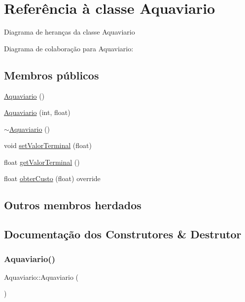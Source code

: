 \hypertarget{classAquaviario}{}\section{Referência à classe Aquaviario}
\label{classAquaviario}


Diagrama de heranças da classe Aquaviario


Diagrama de colaboração para Aquaviario\+:
\subsection*{Membros públicos}
\begin{DoxyCompactItemize}
\item 
\hyperlink{classAquaviario_a75a5b971394d2c3c74bc53293530d7c6}{Aquaviario} ()
\item 
\hyperlink{classAquaviario_a331abedc032bba3076427a3e555dc6fd}{Aquaviario} (int, float)
\item 
\hyperlink{classAquaviario_a71c1378131f32535dcad3e714e643c1d}{$\sim$\+Aquaviario} ()
\item 
void \hyperlink{classAquaviario_a9d2a7813c34be1532570788e15b1fd2a}{set\+Valor\+Terminal} (float)
\item 
float \hyperlink{classAquaviario_a74219219dcaf439a23c53a4c5eb1f151}{get\+Valor\+Terminal} ()
\item 
float \hyperlink{classAquaviario_a14803bda14b188a33a8f726d90171746}{obter\+Custo} (float) override
\end{DoxyCompactItemize}
\subsection*{Outros membros herdados}


\subsection{Documentação dos Construtores \& Destrutor}
\mbox{\label{classAquaviario_a75a5b971394d2c3c74bc53293530d7c6}} 
\subsubsection{\texorpdfstring{Aquaviario()}{Aquaviario()}\hspace{0.1cm}{\footnotesize\ttfamily [1/2]}}
{\footnotesize\ttfamily Aquaviario\+::\+Aquaviario (\begin{DoxyParamCaption}{ }\end{DoxyParamCaption})}

